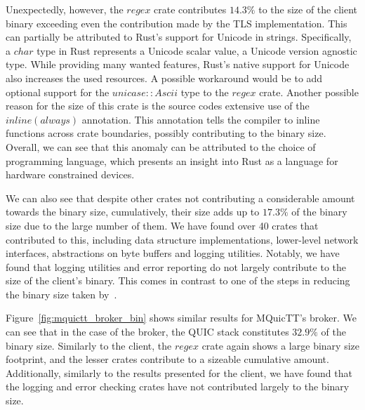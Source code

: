 Unexpectedly, however, the $regex$ crate contributes $14.3\%$ to the size of the client binary exceeding even the contribution made by the TLS implementation.
This can partially be attributed to Rust's support for Unicode in strings.
Specifically, a $char$ type in Rust represents a Unicode scalar value, a Unicode version agnostic type.
While providing many wanted features, Rust's native support for Unicode also increases the used resources.
A possible workaround would be to add optional support for the $unicase::Ascii$ type to the $regex$ crate.
Another possible reason for the size of this crate is the source codes extensive use of the $inline(always)$ annotation.
This annotation tells the compiler to inline functions across crate boundaries, possibly contributing to the binary size.
Overall, we can see that this anomaly can be attributed to the choice of programming language, which presents an insight into Rust as a language for hardware constrained devices.

We can also see that despite other crates not contributing a considerable amount towards the binary size, cumulatively, their size adds up to $17.3\%$ of the binary size due to the large number of them.
We have found over 40 crates that contributed to this, including data structure implementations, lower-level network interfaces, abstractions on byte buffers and logging utilities.
Notably, we have found that logging utilities and error reporting do not largely contribute to the size of the client's binary.
This comes in contrast to one of the steps in reducing the binary size taken by~\cite{eggert_towards_2020}.

Figure~\ref{fig:mquictt_broker_bin} shows similar results for MQuicTT's broker.
We can see that in the case of the broker, the QUIC stack constitutes $32.9\%$ of the binary size.
Similarly to the client, the $regex$ crate again shows a large binary size footprint, and the lesser crates contribute to a sizeable cumulative amount.
Additionally, similarly to the results presented for the client, we have found that the logging and error checking crates have not contributed largely to the binary size.

